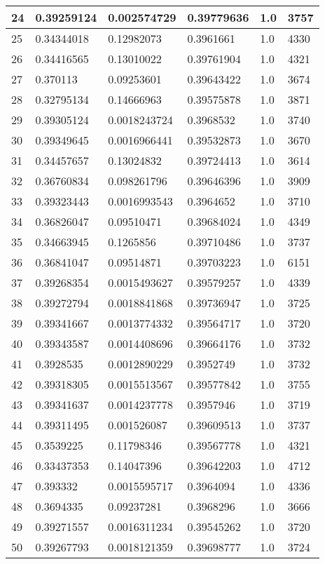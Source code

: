 \begin{longtable}{|l|l|l|l|l|l|}
24 & 0.39259124 & 0.002574729 & 0.39779636 & 1.0 & 3757 \\ \hline 
25 & 0.34344018 & 0.12982073 & 0.3961661 & 1.0 & 4330 \\ \hline 
26 & 0.34416565 & 0.13010022 & 0.39761904 & 1.0 & 4321 \\ \hline 
27 & 0.370113 & 0.09253601 & 0.39643422 & 1.0 & 3674 \\ \hline 
28 & 0.32795134 & 0.14666963 & 0.39575878 & 1.0 & 3871 \\ \hline 
29 & 0.39305124 & 0.0018243724 & 0.3968532 & 1.0 & 3740 \\ \hline 
30 & 0.39349645 & 0.0016966441 & 0.39532873 & 1.0 & 3670 \\ \hline 
31 & 0.34457657 & 0.13024832 & 0.39724413 & 1.0 & 3614 \\ \hline 
32 & 0.36760834 & 0.098261796 & 0.39646396 & 1.0 & 3909 \\ \hline 
33 & 0.39323443 & 0.0016993543 & 0.3964652 & 1.0 & 3710 \\ \hline 
34 & 0.36826047 & 0.09510471 & 0.39684024 & 1.0 & 4349 \\ \hline 
35 & 0.34663945 & 0.1265856 & 0.39710486 & 1.0 & 3737 \\ \hline 
36 & 0.36841047 & 0.09514871 & 0.39703223 & 1.0 & 6151 \\ \hline 
37 & 0.39268354 & 0.0015493627 & 0.39579257 & 1.0 & 4339 \\ \hline 
38 & 0.39272794 & 0.0018841868 & 0.39736947 & 1.0 & 3725 \\ \hline 
39 & 0.39341667 & 0.0013774332 & 0.39564717 & 1.0 & 3720 \\ \hline 
40 & 0.39343587 & 0.0014408696 & 0.39664176 & 1.0 & 3732 \\ \hline 
41 & 0.3928535 & 0.0012890229 & 0.3952749 & 1.0 & 3732 \\ \hline 
42 & 0.39318305 & 0.0015513567 & 0.39577842 & 1.0 & 3755 \\ \hline 
43 & 0.39341637 & 0.0014237778 & 0.3957946 & 1.0 & 3719 \\ \hline 
44 & 0.39311495 & 0.001526087 & 0.39609513 & 1.0 & 3737 \\ \hline 
45 & 0.3539225 & 0.11798346 & 0.39567778 & 1.0 & 4321 \\ \hline 
46 & 0.33437353 & 0.14047396 & 0.39642203 & 1.0 & 4712 \\ \hline 
47 & 0.393332 & 0.0015595717 & 0.3964094 & 1.0 & 4336 \\ \hline 
48 & 0.3694335 & 0.09237281 & 0.3968296 & 1.0 & 3666 \\ \hline 
49 & 0.39271557 & 0.0016311234 & 0.39545262 & 1.0 & 3720 \\ \hline 
50 & 0.39267793 & 0.0018121359 & 0.39698777 & 1.0 & 3724 \\ \hline 
\end{longtable}